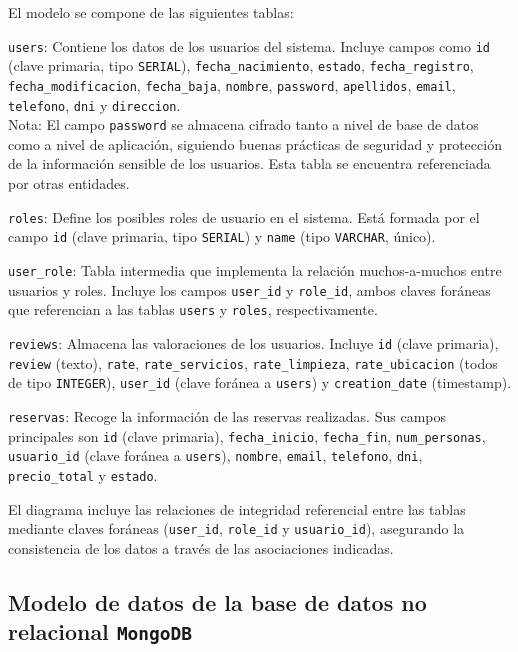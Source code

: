 El modelo se compone de las siguientes tablas:

\texttt{users}: Contiene los datos de los usuarios del sistema. Incluye campos como \texttt{id} (clave primaria, tipo \texttt{SERIAL}), \texttt{fecha\_nacimiento}, \texttt{estado}, \texttt{fecha\_registro}, \texttt{fecha\_modificacion}, \texttt{fecha\_baja}, \texttt{nombre}, \texttt{password}, \texttt{apellidos}, \texttt{email}, \texttt{telefono}, \texttt{dni} y \texttt{direccion}.\\
Nota: El campo \texttt{password} se almacena cifrado tanto a nivel de base de datos como a nivel de aplicación, siguiendo buenas prácticas de seguridad y protección de la información sensible de los usuarios. Esta tabla se encuentra referenciada por otras entidades.

\texttt{roles}: Define los posibles roles de usuario en el sistema. Está formada por el campo \texttt{id} (clave primaria, tipo \texttt{SERIAL}) y \texttt{name} (tipo \texttt{VARCHAR}, único).

\texttt{user\_role}: Tabla intermedia que implementa la relación muchos-a-muchos entre usuarios y roles. Incluye los campos \texttt{user\_id} y \texttt{role\_id}, ambos claves foráneas que referencian a las tablas \texttt{users} y \texttt{roles}, respectivamente.

\texttt{reviews}: Almacena las valoraciones de los usuarios. Incluye \texttt{id} (clave primaria), \texttt{review} (texto), \texttt{rate}, \texttt{rate\_servicios}, \texttt{rate\_limpieza}, \texttt{rate\_ubicacion} (todos de tipo \texttt{INTEGER}), \texttt{user\_id} (clave foránea a \texttt{users}) y \texttt{creation\_date} (timestamp).

\texttt{reservas}: Recoge la información de las reservas realizadas. Sus campos principales son \texttt{id} (clave primaria), \texttt{fecha\_inicio}, \texttt{fecha\_fin}, \texttt{num\_personas}, \texttt{usuario\_id} (clave foránea a \texttt{users}), \texttt{nombre}, \texttt{email}, \texttt{telefono}, \texttt{dni}, \texttt{precio\_total} y \texttt{estado}.

El diagrama incluye las relaciones de integridad referencial entre las tablas mediante claves foráneas (\texttt{user\_id}, \texttt{role\_id} y \texttt{usuario\_id}), asegurando la consistencia de los datos a través de las asociaciones indicadas.

\subsection{Modelo de datos de la base de datos no relacional \texttt{MongoDB}}


